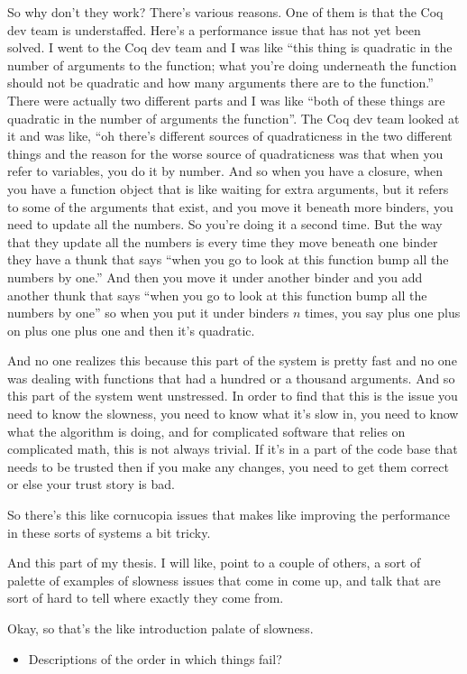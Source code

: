 \begin{subappendices}
So why don't they work?  There's various reasons.  One of them is that the Coq dev team is understaffed. Here's a performance issue that has not yet been solved. I went to the Coq dev team and I was like ``this thing is quadratic in the number of arguments to the function; what you're doing underneath the function should not be quadratic and how many arguments there are to the function.''  There were actually two different parts and I was like ``both of these things are quadratic in the number of arguments the function''.  The Coq dev team looked at it and was like, ``oh there's different sources of quadraticness in the two different things and the reason for the worse source of quadraticness was that when you refer to variables, you do it by number. And so when you have a closure, when you have a function object that is like waiting for extra arguments, but it refers to some of the arguments that exist, and you move it beneath more binders, you need to update all the numbers.  So you're doing it a second time. But the way that they update all the numbers is every time they move beneath one binder they have a thunk that says ``when you go to look at this function bump all the numbers by one.'' And then you move it under another binder and you add another thunk that says ``when you go to look at this function bump all the numbers by one'' so when you put it under binders $n$ times, you say plus one plus on plus one plus one and then it's quadratic. 

And no one realizes this because this part of the system is pretty fast and no one was dealing with functions that had a hundred or a thousand arguments. And so this part of the system went unstressed.  In order to find that this is the issue you need to know the slowness, you need to know what it's slow in, you need to know what the algorithm is doing, and for complicated software that relies on complicated math, this is not always trivial. If it's in a part of the code base that needs to be trusted then if you make any changes, you need to get them correct or else your trust story is bad. 

So there's this like cornucopia issues that makes like improving the performance in these sorts of systems a bit tricky. 

And this part of my thesis. I will like, point to a couple of others, a sort of palette of examples of slowness issues that come in come up, and talk that are sort of hard to tell where exactly they come from.

Okay, so that's the like introduction palate of slowness.


\begin{itemize}
\item Descriptions of the order in which things fail?
\end{itemize}
\end{subappendices}